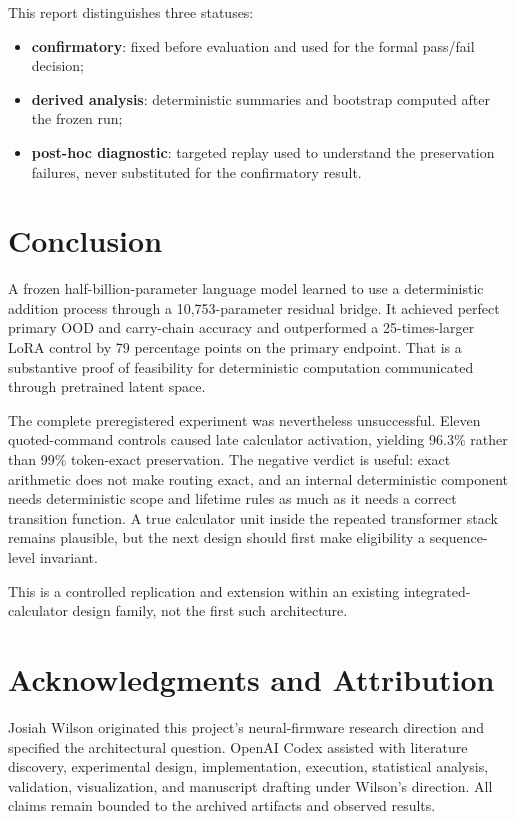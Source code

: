\documentclass[11pt]{article}
\begin{document}
This report distinguishes three statuses:

\begin{itemize}
  \item \textbf{confirmatory}: fixed before evaluation and used for the formal
  pass/fail decision;
  \item \textbf{derived analysis}: deterministic summaries and bootstrap
  computed after the frozen run;
  \item \textbf{post-hoc diagnostic}: targeted replay used to understand the
  preservation failures, never substituted for the confirmatory result.
\end{itemize}

\section{Conclusion}

A frozen half-billion-parameter language model learned to use a deterministic
addition process through a 10,753-parameter residual bridge. It achieved
perfect primary OOD and carry-chain accuracy and outperformed a 25-times-larger
LoRA control by 79 percentage points on the primary endpoint. That is a
substantive proof of feasibility for deterministic computation communicated
through pretrained latent space.

The complete preregistered experiment was nevertheless unsuccessful. Eleven
quoted-command controls caused late calculator activation, yielding 96.3\%
rather than 99\% token-exact preservation. The negative verdict is useful:
exact arithmetic does not make routing exact, and an internal deterministic
component needs deterministic scope and lifetime rules as much as it needs a
correct transition function. A true calculator unit inside the repeated
transformer stack remains plausible, but the next design should first make
eligibility a sequence-level invariant.

This is a controlled replication and extension within an existing
integrated-calculator design family, not the first such architecture.

\section*{Acknowledgments and Attribution}

Josiah Wilson originated this project's neural-firmware research direction and
specified the architectural question. OpenAI Codex assisted with literature
discovery, experimental design, implementation, execution, statistical
analysis, validation, visualization, and manuscript drafting under Wilson's
direction. All claims remain bounded to the archived artifacts and observed
results.
\end{document}
